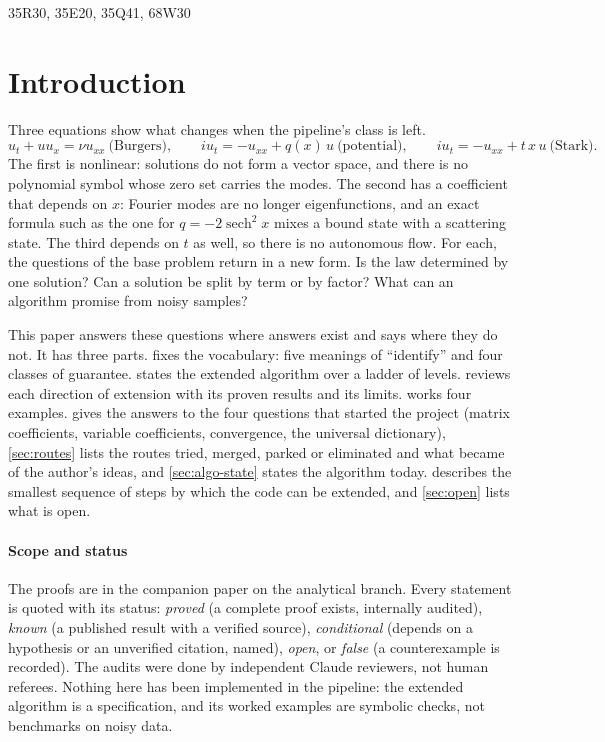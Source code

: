 \begin{MSCcodes}
35R30, 35E20, 35Q41, 68W30
\end{MSCcodes}

\section{Introduction}\label{sec:intro}
Three equations show what changes when the pipeline's class is left.
\begin{equation}\label{eq:three}
u_t+uu_x=\nu u_{xx}\ \text{(Burgers)},\qquad
iu_t=-u_{xx}+q(x)\,u\ \text{(potential)},\qquad
iu_t=-u_{xx}+t\,x\,u\ \text{(Stark)}.
\end{equation}
The first is nonlinear: solutions do not form a vector space, and there is no polynomial symbol whose zero set carries the modes. The second
has a coefficient that depends on $x$: Fourier modes are no longer eigenfunctions, and an exact formula such as the one for
$q=-2\operatorname{sech}^2x$ mixes a bound state with a scattering state. The third depends on $t$ as well, so there is no autonomous
flow. For each, the questions of the base problem return in a new form. Is the law determined by one solution? Can a solution be split by
term or by factor? What can an algorithm promise from noisy samples?

This paper answers these questions where answers exist and says where they do not. It has three parts.  fixes the
vocabulary: five meanings of ``identify'' and four classes of guarantee.  states the extended algorithm over a ladder of
levels.  reviews each direction of extension with its proven results and its limits.  works four
examples.  gives the answers to the four questions that started the project (matrix coefficients, variable coefficients, convergence, the universal dictionary), \cref{sec:routes} lists the routes tried, merged, parked or eliminated and what became of the author's ideas, and \cref{sec:algo-state} states the algorithm today.  describes the smallest sequence of steps by which the code can be extended, and \cref{sec:open} lists what is open.

\paragraph{Scope and status} The proofs are in the companion paper on the analytical branch. Every statement is quoted with its status:
\emph{proved} (a complete proof exists, internally audited), \emph{known} (a published result with a verified source), \emph{conditional} (depends on a hypothesis or an unverified citation, named),
\emph{open}, or \emph{false} (a counterexample is recorded). The audits were done by independent Claude reviewers, not human referees.
Nothing here has been implemented in the pipeline: the extended algorithm is a specification, and its worked examples are symbolic checks, not
benchmarks on noisy data.

